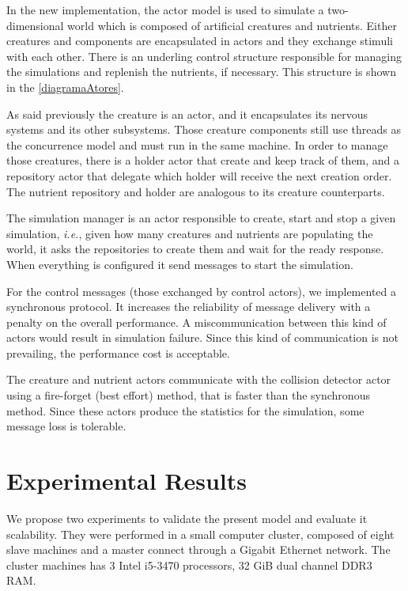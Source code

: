 \documentclass{aamas2017}
\begin{document}
In the new implementation, the actor model is used to simulate a two-dimensional world which is composed of artificial creatures and nutrients. Either creatures and components are encapsulated in actors and they exchange stimuli with each other. There is an underling control structure responsible for managing the simulations and replenish the nutrients, if necessary. This structure is shown in the \autoref{diagramaAtores}.

As said previously the creature is an actor, and it encapsulates its nervous systems and its other subsystems. Those creature components still use threads as the concurrence model and must run in the same machine. In order to manage those creatures, there is a holder actor that create and keep track of them, and a repository actor that delegate which holder will receive the next creation order. The nutrient repository and holder are analogous to its creature counterparts.

The simulation manager is an actor responsible to create, start and stop a given simulation, \textit{i.e.}, given how many creatures and nutrients are populating the world, it asks the repositories to create them and wait for the ready response. When everything is configured it send messages to start the simulation.

For the control messages (those exchanged by control actors), we implemented a synchronous protocol. It increases the reliability of message delivery with a penalty on the overall performance. A miscommunication between this kind of actors would result in simulation failure. Since this kind of communication is not prevailing, the performance cost is acceptable.

The creature and nutrient actors communicate with the collision detector actor using a fire-forget (best effort) method, that is faster than the synchronous method. Since these actors produce the statistics for the simulation, some message loss is tolerable.

\section{Experimental Results}
\label{sec:results}

We propose two experiments to validate the present model and evaluate it scalability. They were performed in a small computer cluster, composed of eight slave machines and a master connect through a Gigabit Ethernet network. The cluster machines has 3 Intel i5-3470 processors, 32 GiB dual channel DDR3 RAM. 
\end{document}
